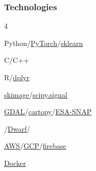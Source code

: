 \documentclass{article}
\newenvironment{mylist}[2]{
  \subsubsection*{#1}
  \begin{multicols}{#2}
  \small
  \begin{list}{}{}
   \setlength{\topsep}{0pt}
   \setlength{\itemsep}{1pt}
   \setlength{\parskip}{0pt}
   \setlength{\parsep}{0pt}}{\end{list}\end{multicols}\normalsize}
\def\bsp{-.3in}
\begin{document}
\begin{mylist}{Technologies}{4}
\item Python/\href{https://pytorch.org/}{PyTorch}/\href{https://scikit-learn.org/stable/}{sklearn}
\item C/C++
\item R/\href{https://dplyr.tidyverse.org/}{dplyr}
\item \href{https://scikit-image.org/}{skimage}/\href{https://scipy.github.io/devdocs/reference/signal.html#module-scipy.signal}{scipy.signal}
\item \href{https://gdal.org/en/stable/}{GDAL}/\href{https://scitools.org.uk/cartopy/docs/latest/}{cartopy}/\href{https://step.esa.int/main/download/snap-download/}{ESA-SNAP}
\item \href{https://pypi.org/project/gtirb/}{}/\href{https://dwarfstd.org/}{Dwarf}/\href{https://pypi.org/project/asts/}{}
\item \href{https://aws.amazon.com/}{AWS}/\href{https://cloud.google.com/}{GCP}/\href{https://firebase.google.com/}{firebase}
\item \href{https://www.docker.com/}{Docker}
\end{mylist}

\newcommand{\BSec}[1]{
\noindent{\hspace{\bsp} \LARGE{\bf #1}{ }\hrulefill}}
\TabPositions{2.1in} %
\def\tabb{\tab- }  %
\end{document}
